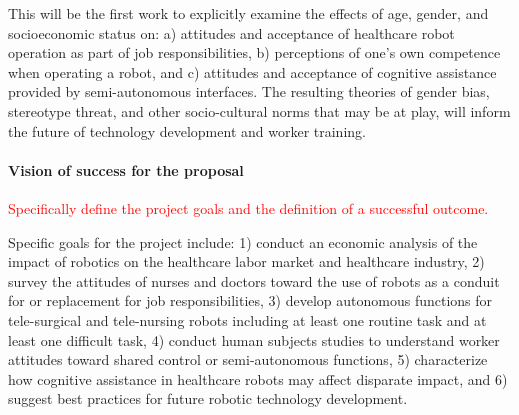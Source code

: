 This will be the first work to explicitly examine the effects of age, gender, and socioeconomic status on: a) attitudes and acceptance of healthcare robot operation as part of job responsibilities, b) perceptions of one's own competence when operating a robot, and c) attitudes and acceptance of cognitive assistance provided by semi-autonomous interfaces.  The resulting theories of gender bias, stereotype threat, and other socio-cultural norms that may be at play, will inform the future of technology development and worker training. 
 
\paragraph*{Vision of success for the proposal}
\textcolor{red}{Specifically define the project goals and the definition of a successful outcome.}

Specific goals for the project include: 1) conduct an economic analysis of the impact of robotics on the healthcare labor market and healthcare industry, 2) survey the attitudes of nurses and doctors toward the use of robots as a conduit for or replacement for job responsibilities, 3) develop autonomous functions for tele-surgical and tele-nursing robots including at least one routine task and at least one difficult task, 4) conduct human subjects studies to understand worker attitudes toward shared control or semi-autonomous functions, 5) characterize how cognitive assistance in healthcare robots may affect disparate impact, and 6) suggest best practices for future robotic technology development.